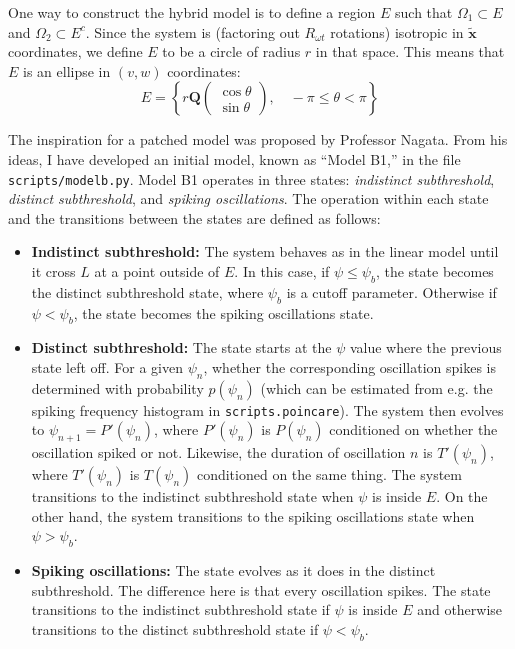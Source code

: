 \documentclass[letterpaper,12pt]{article}
\numberwithin{table}{section}
\numberwithin{figure}{section}
\numberwithin{equation}{section}
\newcommand*{\qvec}[2]{\begin{pmatrix} #1 \\ #2 \end{pmatrix}}
\begin{document}
\begin{flushleft}
    One way to construct the hybrid model is to define a region $E$ such that $\Omega_1 \subset E$ and $\Omega_2 \subset E^c$. Since the system is (factoring out $R_{\omega t}$ rotations) isotropic in $\mathbf{\tilde{x}}$ coordinates, we define $E$ to be a circle of radius $r$ in that space. This means that $E$ is an ellipse in $(v, w)$ coordinates:
    \begin{equation}
        E = \left\{r\mathbf{Q}\qvec{\cos\theta}{\sin\theta}, \quad -\pi \leq \theta < \pi\right\}
    \end{equation}

    The inspiration for a patched model was proposed by Professor Nagata. From his ideas, I have developed an initial model, known as ``Model B1,'' in the file \texttt{scripts/modelb.py}. Model B1 operates in three states: \textit{indistinct subthreshold}, \textit{distinct subthreshold}, and \textit{spiking oscillations}. The operation within each state and the transitions between the states are defined as follows:
    \begin{itemize}
        \item \textbf{Indistinct subthreshold:} The system behaves as in the linear model until it cross $L$ at a point outside of $E$. In this case, if $\psi \leq \psi_b$, the state becomes the distinct subthreshold state, where $\psi_b$ is a cutoff parameter. Otherwise if $\psi < \psi_b$, the state becomes the spiking oscillations state.
        \item \textbf{Distinct subthreshold:} The state starts at the $\psi$ value where the previous state left off. For a given $\psi_n$, whether the corresponding oscillation spikes is determined with probability $p(\psi_n)$ (which can be estimated from e.g. the spiking frequency histogram in \texttt{scripts.poincare}). The system then evolves to $\psi_{n+1} = P'(\psi_n)$, where $P'(\psi_n)$ is $P(\psi_n)$ conditioned on whether the oscillation spiked or not. Likewise, the duration of oscillation $n$ is $T'(\psi_n)$, where $T'(\psi_n)$ is $T(\psi_n)$ conditioned on the same thing. The system transitions to the indistinct subthreshold state when $\psi$ is inside $E$. On the other hand, the system transitions to the spiking oscillations state when $\psi > \psi_b$.
        \item \textbf{Spiking oscillations:} The state evolves as it does in the distinct subthreshold. The difference here is that every oscillation spikes. The state transitions to the indistinct subthreshold state if $\psi$ is inside $E$ and otherwise transitions to the distinct subthreshold state if $\psi < \psi_b$.
    \end{itemize}


\end{flushleft}
\end{document}
